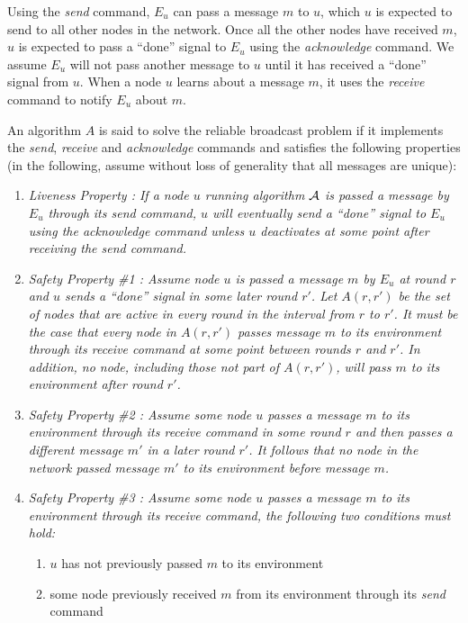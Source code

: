 \documentclass[english]{article}
\begin{document}
Using the \textit{send} command, $E_u$ can pass a message $m$ to $u$, which $u$ is expected to send to all other nodes in the network. Once all the other nodes have received $m$, $u$ is expected to pass a ``done'' signal to $E_u$ using the \textit{acknowledge} command. We assume $E_u$ will not pass another message to $u$ until it has received a ``done'' signal from $u$. 
When a node $u$ learns about a message $m$, it uses the \textit{receive} command to notify $E_u$ about $m$.

An algorithm $A$ is said to solve the reliable broadcast problem if it implements the \textit{send}, \textit{receive} and \textit{acknowledge} commands and satisfies the following properties (in the following, assume without loss of generality that all messages are unique):

\begin {enumerate}
 
  \item \em Liveness Property \em: If a node $u$ running algorithm $\cal A$ is passed a message by $E_u$ through its \textit{send} command, $u$ will eventually send  a ``done'' signal to $E_u$ using the \textit{acknowledge} command unless $u$ deactivates at some point after receiving the \textit{send} command.

  \item \em Safety Property \#1 \em: Assume node $u$ is passed a message $m$ by $E_u$ at round $r$ and $u$ sends  a ``done'' signal in some later round $r'$. Let $A(r,r')$ be the set of nodes that are active in every round in the interval from $r$ to $r'$. It must be the case that every node in $A(r,r')$ passes message $m$ to its environment through its \textit{receive} command at some point between rounds $r$ and $r'$. In addition, no node, including those not part of $A(r,r')$, will pass $m$ to its environment after round $r'$. 

  \item \em Safety Property \#2 \em: Assume some node $u$ passes a message $m$ to its environment through its \textit{receive} command in some round $r$ and then passes a different message $m'$ in a later round $r'$. It follows that no node in the network passed message $m'$ to its environment before message $m$. 

  \item \em Safety Property \#3 \em: Assume some node $u$ passes a message $m$ to its environment through its \textit{receive} command, the following two conditions must hold:
  \begin {enumerate}
    \item $u$ has not previously passed $m$ to its environment
    \item some node previously received $m$ from its environment through its \textit{send} command
  \end{enumerate}

\end{enumerate}
\end{document}
